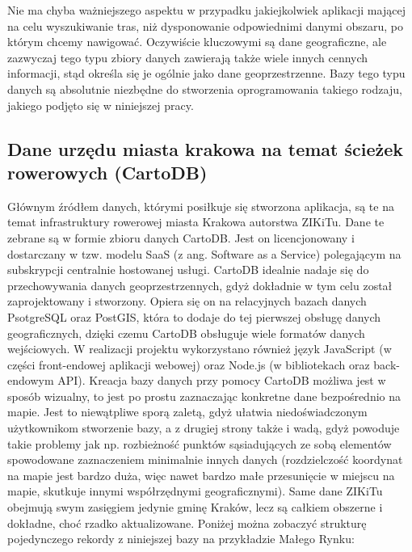 Nie ma chyba ważniejszego aspektu w przypadku jakiejkolwiek aplikacji mającej na celu wyszukiwanie tras, niż dysponowanie odpowiednimi danymi obszaru, po którym chcemy nawigować. Oczywiście kluczowymi są dane geograficzne, ale zazwyczaj tego typu zbiory danych zawierają także wiele innych cennych informacji, stąd określa się je ogólnie jako dane geoprzestrzenne. Bazy tego typu danych są absolutnie niezbędne do stworzenia oprogramowania takiego rodzaju, jakiego podjęto się w niniejszej pracy.


\subsection{Dane urzędu miasta krakowa na temat ścieżek rowerowych (CartoDB)}

Głównym źródłem danych, którymi posiłkuje się stworzona aplikacja, są te na temat infrastruktury rowerowej miasta Krakowa autorstwa ZIKiTu. Dane te zebrane są w formie zbioru danych CartoDB. Jest on licencjonowany i dostarczany w tzw. modelu SaaS (z ang. Software as a Service) polegającym na subskrypcji centralnie hostowanej usługi. CartoDB idealnie nadaje się do przechowywania danych geoprzestrzennych, gdyż dokładnie w tym celu został zaprojektowany i stworzony. Opiera się on na relacyjnych bazach danych PsotgreSQL oraz PostGIS, która to dodaje do tej pierwszej obsługę danych geograficznych, dzięki czemu CartoDB obsługuje wiele formatów danych wejściowych. W realizacji projektu wykorzystano również język JavaScript (w części front-endowej aplikacji webowej) oraz Node.js (w bibliotekach oraz back-endowym API). Kreacja bazy danych przy pomocy CartoDB możliwa jest w sposób wizualny, to jest po prostu zaznaczając konkretne dane bezpośrednio na mapie. Jest to niewątpliwe sporą zaletą, gdyż ułatwia niedoświadczonym użytkownikom stworzenie bazy, a z drugiej strony także i wadą, gdyż powoduje takie problemy jak np. rozbieżność punktów sąsiadujących ze sobą elementów spowodowane zaznaczeniem minimalnie innych danych (rozdzielczość koordynat na mapie jest bardzo duża, więc nawet bardzo małe przesunięcie w miejscu na mapie, skutkuje innymi współrzędnymi geograficznymi).\newline
Same dane ZIKiTu obejmują swym zasięgiem jedynie gminę Kraków, lecz są całkiem obszerne i dokładne, choć rzadko aktualizowane. Poniżej można zobaczyć strukturę pojedynczego rekordy z niniejszej bazy na przykładzie Małego Rynku: \newline

